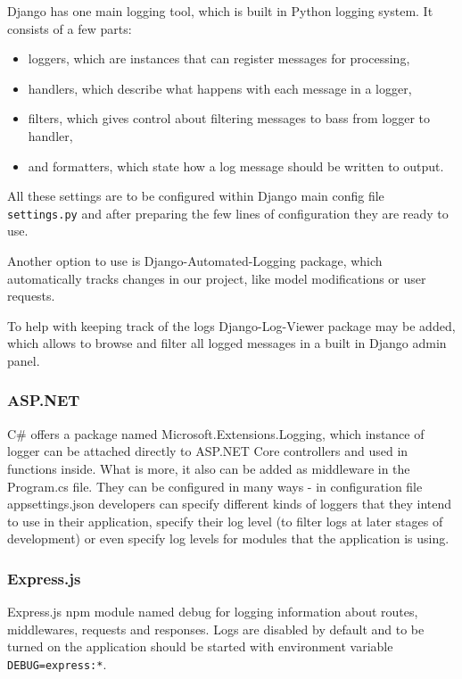 Django has one main logging tool, which is built in Python logging system. It consists of a few parts:
\begin{itemize}
      \item loggers, which are instances that can register messages for processing,
      \item handlers, which describe what happens with each message in a logger,
      \item filters, which gives control about filtering messages to bass from logger to handler,
      \item and formatters, which state how a log message should be written to output.
\end{itemize}
All these settings are to be configured within Django main config file \lstinline{settings.py} and after preparing the few lines of configuration they are ready to use.

Another option to use is Django-Automated-Logging package, which automatically tracks changes in our project, like model modifications or user requests.

To help with keeping track of the logs Django-Log-Viewer package may be added, which allows to browse and filter all logged messages in a built in Django admin panel.

\subsubsection{ASP.NET}

C\# offers a package named Microsoft.Extensions.Logging, which instance of logger can be attached directly to ASP.NET Core controllers and used in functions inside. What is more, it also can be added as middleware in the Program.cs file. They can be configured in many ways - in configuration file appsettings.json developers can specify different kinds of loggers that they intend to use in their application, specify their log level (to filter logs at later stages of development) or even specify log levels for modules that the application is using.

\subsubsection{Express.js}

Express.js \acrshort{npm} module named debug for logging information about routes, middlewares, requests and responses. Logs are disabled by default and to be turned on the application should be started with environment variable \lstinline{DEBUG=express:*}.

